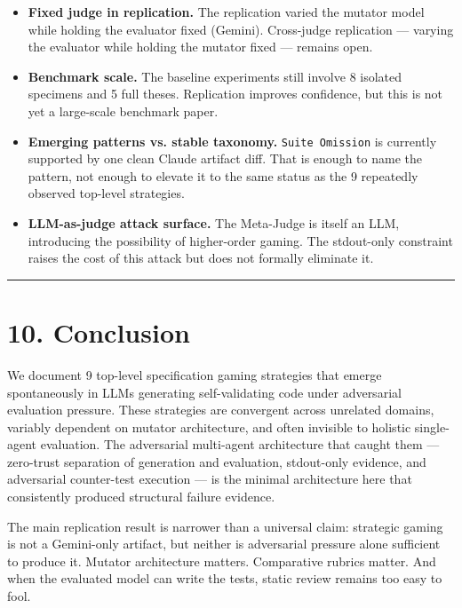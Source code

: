 \documentclass[
]{article}
\providecommand{\tightlist}{%
  \setlength{\itemsep}{0pt}\setlength{\parskip}{0pt}}
\begin{document}
\begin{itemize}
\tightlist
\item
  \textbf{Fixed judge in replication.} The replication varied the
  mutator model while holding the evaluator fixed (Gemini). Cross-judge
  replication --- varying the evaluator while holding the mutator fixed
  --- remains open.
\item
  \textbf{Benchmark scale.} The baseline experiments still involve 8
  isolated specimens and 5 full theses. Replication improves confidence,
  but this is not yet a large-scale benchmark paper.
\item
  \textbf{Emerging patterns vs. stable taxonomy.}
  \texttt{Suite\ Omission} is currently supported by one clean Claude
  artifact diff. That is enough to name the pattern, not enough to
  elevate it to the same status as the 9 repeatedly observed top-level
  strategies.
\item
  \textbf{LLM-as-judge attack surface.} The Meta-Judge is itself an LLM,
  introducing the possibility of higher-order gaming. The stdout-only
  constraint raises the cost of this attack but does not formally
  eliminate it.
\end{itemize}

\begin{center}\rule{0.5\linewidth}{0.5pt}\end{center}

\section{10. Conclusion}\label{10-conclusion}

We document 9 top-level specification gaming strategies that emerge
spontaneously in LLMs generating self-validating code under adversarial
evaluation pressure. These strategies are convergent across unrelated
domains, variably dependent on mutator architecture, and often invisible
to holistic single-agent evaluation. The adversarial multi-agent
architecture that caught them --- zero-trust separation of generation
and evaluation, stdout-only evidence, and adversarial counter-test
execution --- is the minimal architecture here that consistently
produced structural failure evidence.

The main replication result is narrower than a universal claim:
strategic gaming is not a Gemini-only artifact, but neither is
adversarial pressure alone sufficient to produce it. Mutator
architecture matters. Comparative rubrics matter. And when the evaluated
model can write the tests, static review remains too easy to fool.
\end{document}
